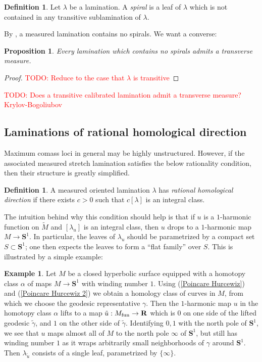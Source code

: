 \documentclass[reqno,11pt]{amsart}
\newcommand{\RR}{\mathbf{R}}
\newcommand{\Sph}{\mathbf S}
\newcommand{\dfn}[1]{\emph{#1}\index{#1}}
\newtheorem{proposition}[theorem]{Proposition}
\theoremstyle{definition}
\newtheorem{definition}[theorem]{Definition}
\newtheorem{example}[theorem]{Example}
\numberwithin{equation}{section}
\newcommand\todo[1]{\textcolor{red}{TODO: #1}}
\begin{document}
\begin{definition}
Let $\lambda$ be a lamination.
A \dfn{spiral} is a leaf of $\lambda$ which is not contained in any transitive sublamination of $\lambda$.
\end{definition}

By \cite[Theorem 3.2]{Morgan88}, a measured lamination contains no spirals.
We want a converse:

\begin{proposition}
Every lamination which contains no spirals admits a transverse measure.
\end{proposition}
\begin{proof}
\todo{Reduce to the case that $\lambda$ is transitive}


\end{proof}

\todo{Does a transitive calibrated lamination admit a transverse measure? Krylov-Bogoliubov}



\subsection{Laminations of rational homological direction}
Maximum comass loci in general may be highly unstructured.
However, if the associated measured stretch lamination satisfies the below rationality condition, then their structure is greatly simplified.

\begin{definition}
A measured oriented lamination $\lambda$ has \dfn{rational homological direction} if there exists $c > 0$ such that $c [\lambda]$ is an integral class.
\end{definition}

The intuition behind why this condition should help is that if $u$ is a $1$-harmonic function on $\tilde M$ and $[\lambda_u]$ is an integral class, then $u$ drops to a $1$-harmonic map $M \to \Sph^1$.
In particular, the leaves of $\lambda_u$ should be parametrized by a compact set $S \subset \Sph^1$; one then expects the leaves to form a ``flat family'' over $S$.
This is illustrated by a simple example:

\begin{example}
Let $M$ be a closed hyperbolic surface equipped with a homotopy class $\alpha$ of maps $M \to \Sph^1$ with winding number $1$.
Using (\ref{Poincare Hurcewiz}) and (\ref{Poincare Hurcewiz 2}) we obtain a homology class of curves in $M$, from which we choose the geodesic representative $\gamma$.
Then the $1$-harmonic map $u$ in the homotopy class $\alpha$ lifts to a map $\tilde u: M_{\rm fun} \to \RR$ which is $0$ on one side of the lifted geodesic $\tilde \gamma$, and $1$ on the other side of $\tilde \gamma$.
Identifying $0, 1$ with the north pole of $\Sph^1$, we see that $u$ maps almost all of $M$ to the north pole $\infty$ of $\Sph^1$, but still has winding number $1$ as it wraps arbitrarily small neighborhoods of $\gamma$ around $\Sph^1$.
Then $\lambda_{\tilde u}$ consists of a single leaf, parametrized by $\{\infty\}$.
\end{example}
\end{document}
